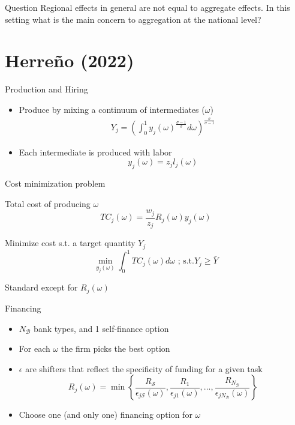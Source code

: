 \documentclass[english,xcolor=svgnames]{beamer}
\begin{document}
\begin{frame}{Question}
Regional effects in general are not equal to aggregate effects. In this setting what is the main concern to aggregation at the national level?
\end{frame}

\section{Herre\~no (2022)}


\begin{frame}{Production and Hiring}
\begin{itemize}
\item Produce by mixing a continuum of intermediates ($\omega$)
\begin{align*}
Y_{j} = \left(\int_{0}^{1} y_{j}(\omega)^{\frac{\sigma-1}{\sigma}} d\omega\right)^{\frac{\sigma}{\sigma - 1}}
\end{align*}
\item Each intermediate is produced with labor
$$y_{j}(\omega) = z_{j}  l_{j}(\omega)$$
\end{itemize}
\end{frame}

\begin{frame}{Cost minimization problem}\label{cm}

Total cost of producing $\omega$
$$TC_{j}(\omega) = \frac{w_j}{z_j} R_j(\omega)  y_j(\omega)$$


Minimize cost s.t. a target quantity $Y_j$
$$\min_{y_j(\omega)} \int_0^1 TC_{j}(\omega) d\omega \text{   ;   s.t.}  Y_{j} \geq \bar{Y} $$

Standard except for $R_j(\omega)$\\
\hyperlink{cm_details}{}
\end{frame}


\begin{frame}{Financing}
\begin{itemize}
\item $N_{\mathcal{B}}$ bank types, and 1 self-finance option
\item For each $\omega$ the firm picks the best option
\item $\epsilon$ are shifters that reflect the specificity of funding for a given task
$${R}_j(\omega) =  \min \left\lbrace\frac{R_{\mathcal{S}}}{\epsilon_{j\mathcal{S}}(\omega)}, \frac{R_{1}}{\epsilon_{j1}(\omega)}, ..., \frac{R_{N_{\mathcal{B}}}}{\epsilon_{jN_{\mathcal{B}}}(\omega)}\right\rbrace$$
\item Choose one (and only one) financing option for $\omega$
\end{itemize}
\end{frame}
\end{document}
